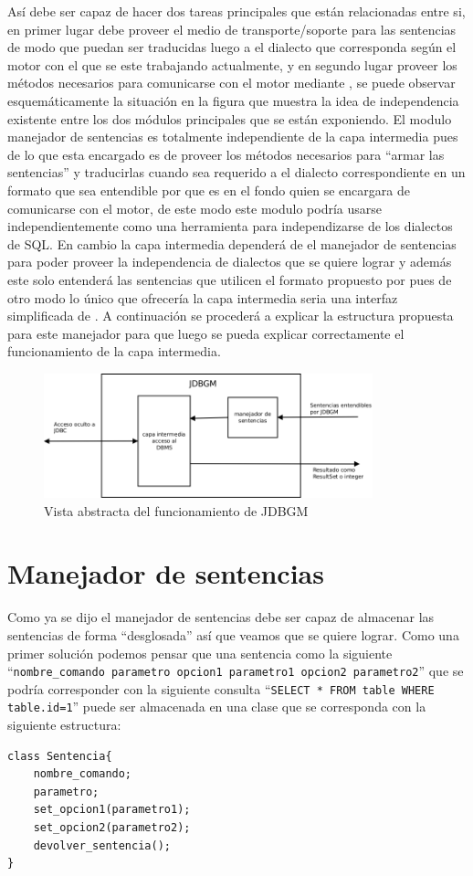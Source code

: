 Así \jj debe ser capaz de hacer dos tareas principales que están relacionadas entre si, en primer lugar debe proveer el medio de transporte/soporte para las sentencias de modo que puedan ser traducidas luego a el dialecto que corresponda según el motor con el que se este trabajando actualmente, y en segundo lugar proveer los métodos necesarios para comunicarse con el motor mediante \jd, se puede observar esquemáticamente la situación en la figura  que muestra la idea de independencia existente entre los dos módulos principales que se están exponiendo. El modulo manejador de sentencias es totalmente independiente de la capa intermedia pues de lo que esta encargado es de proveer los métodos necesarios para ``armar las sentencias'' y traducirlas cuando sea requerido a el dialecto correspondiente en un formato que sea entendible por \jd que es en el fondo quien se encargara de comunicarse con el motor, de este modo este modulo podría usarse independientemente como una herramienta para independizarse de los dialectos de SQL. En cambio la capa intermedia dependerá de el manejador de sentencias para poder proveer la independencia de dialectos que se quiere lograr y además este solo entenderá las sentencias que utilicen el formato propuesto por \jj pues de otro modo lo único que ofrecería la capa intermedia seria una interfaz simplificada de \jd. A continuación se procederá a explicar la estructura propuesta para este manejador para que luego se pueda explicar correctamente el funcionamiento de la capa intermedia.
%
\begin{figure}
  \centering
    \includegraphics[width=0.85\textwidth]{figuras/jdbgm-closerlook.png}
  \caption{Vista abstracta del funcionamiento de JDBGM}
  \label{fig:jdbgm:closerlook}
\end{figure}

\section{Manejador de sentencias}
Como ya se dijo el manejador de sentencias debe ser capaz de almacenar las sentencias de forma ``desglosada'' así que veamos que se quiere lograr. Como una primer solución podemos pensar que una sentencia como la siguiente ``\verb=nombre_comando parametro opcion1 parametro1 opcion2 parametro2='' que se podría corresponder con la siguiente consulta ``\verb|SELECT * FROM table WHERE table.id=1|'' puede ser almacenada en una clase que se corresponda con la siguiente estructura:
%
\begin{lstlisting}[title=Pseudocódigo de la estructura de dato que contiene la sentencia]
class Sentencia{
	nombre_comando;
	parametro;
	set_opcion1(parametro1);
	set_opcion2(parametro2);
	devolver_sentencia();
}
\end{lstlisting}

